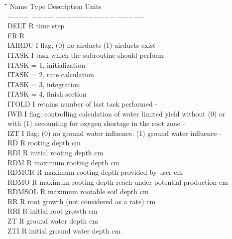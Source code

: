 \documentclass[11pt]{article}
\begin{document}
\begin{tabbing}
\hspace{1.27cm}\=\hspace{1.27cm}\=\hspace{1.27cm}\=\hspace{1.27cm}\=%
\hspace{1.27cm}\=\hspace{1.27cm}\=\hspace{1.27cm}\=\hspace{1.27cm}\=%
\hspace{1.27cm}\=\hspace{1.27cm}\=\kill
Name    \> \> Type   \> Description                                        \> \> \> \> \> \> \> Units\\
$-$$-$$-$$-$    \> \> $-$$-$$-$$-$   \> $-$$-$$-$$-$$-$$-$$-$$-$$-$$-$$-$                                        \> \> \> \> \> \> \> $-$$-$$-$$-$$-$\\
DELT\> \> R\> time step\\
FR\> \> R\> \\
IAIRDU\> \> I\> flag; (0) no airducts (1) airducts exist\> \> \> \> \> \> \> -\\
ITASK\> \> I\> task which the subroutine should perform\> \> \> \> \> \> \> -\\
\>\> \> ITASK = 1, initialization\\
\>\> \> ITASK = 2, rate calculation\\
\>\> \> ITASK = 3, integration\\
\>\> \> ITASK = 4, finish section\\
ITOLD\> \> I\> retains number of last task performed\> \> \> \> \> \> \> -\\
IWB\> \> I\> flag; controlling calculation of water limited yield without (0) or \\
\>\> \> with (1) accounting for oxygen shortage in the root zone\> \> \> \> \> \> \> -\\
IZT\> \> I\> flag; (0) no ground water influence, (1) ground water influence\> \> \> \> \> \> \> -\\
RD\> \> R\> rooting depth\> \> \> \> \> \> \> cm\\
RDI\> \> R\> initial rooting depth\> \> \> \> \> \> \> cm\\
RDM\> \> R\> maximum rooting depth\> \> \> \> \> \> \> cm\\
RDMCR\> \> R\> maximum rooting depth provided by user\> \> \> \> \> \> \> cm\\
RDMO\> \> R\> maximum rooting depth reach under potential production\> \> \> \> \> \> \> cm\\
RDMSOL\> \> R\> maximum rootable soil depth\> \> \> \> \> \> \> cm\\
RR\> \> R\> root growth (not considered as a rate)\> \> \> \> \> \> \> cm \\
RRI\> \> R\> initial root growth\> \> \> \> \> \> \> cm\\
ZT\> \> R\> ground water depth\> \> \> \> \> \> \> cm\\
ZTI\> \> R\> initial ground water depth\> \> \> \> \> \> \> cm
\end{tabbing}
\end{document}

